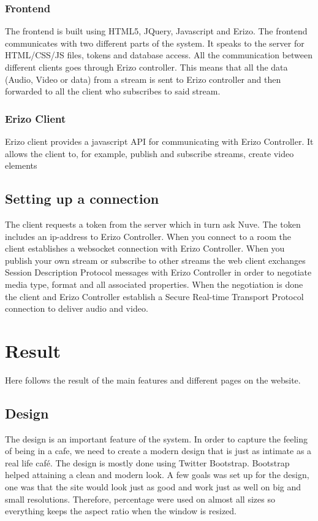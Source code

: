 \documentclass[12pt, titlepage]{article}
\begin{document}
\subsubsection{Frontend}
The frontend is built using HTML5, JQuery, Javascript and Erizo. The frontend communicates with two different parts of the system. It speaks to the server for HTML/CSS/JS files, tokens and database access. All the communication between different clients goes through Erizo controller. This means that all the data (Audio, Video or data) from a stream is sent to Erizo controller and then forwarded to all the client who subscribes to said stream.
\subsubsection{Erizo Client}
Erizo client provides a javascript API for communicating with Erizo Controller. It allows the client to, for example, publish and subscribe streams, create video elements
\subsection{Setting up a connection}
The client requests a token from the server which in turn ask Nuve. The token includes an ip-address to Erizo Controller. When you connect to a room the client establishes a websocket connection with Erizo Controller. When you publish your own stream or subscribe to other streams the web client exchanges Session Description Protocol messages with Erizo Controller in order to negotiate media type, format and all associated properties. When the negotiation is done the client and Erizo Controller establish a Secure Real-time Transport Protocol connection to deliver audio and video.
\section{Result}
Here follows the result of the main features and different pages on the website.
\subsection{Design}
The design is an important feature of the system. In order to capture the feeling of being in a cafe, we need to create a modern design that is just as intimate as a real life café. The design is mostly done using Twitter Bootstrap. Bootstrap helped attaining a clean and modern look. A few goals was set up for the design, one was that the site would look just as good and work just as well on big and small resolutions. Therefore, percentage were used on almost all sizes so everything keeps the aspect ratio when the window is resized. 
\end{document}
